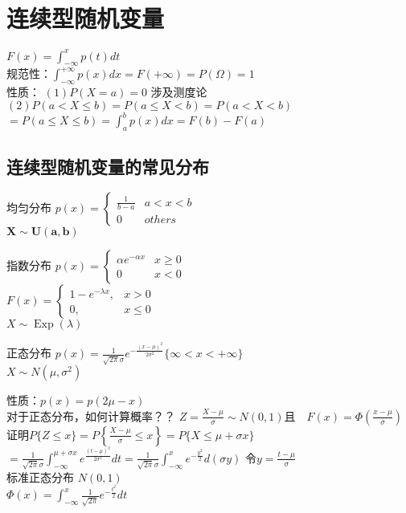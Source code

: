 \documentclass[cn,11pt,chinese,black]{elegantbook}
\begin{document}
\section{连续型随机变量 }
$F(x)=\int_{-\infty}^{x} p(t) d t$\\
规范性：$\int_{-\infty}^{+\infty} p(x) d x=F(+\infty)=P(\Omega)=1$\\
性质：
$(1)P(X=a)=0$ 涉及测度论\\
$(2)P(a<X \leq b)=P(a \leq X<b)=P(a<X<b)$\\
$=P(a \leq X \leq b)=\int_{a}^{b} p(x) d x=F(b)-F(a)$
\subsection{连续型随机变量的常见分布}
\begin{definition}{均匀分布}
$p(x)=\left\{\begin{array}{ll}{\frac{1}{b-a}} & {a<x<b} \\ {0} & {others}\end{array}\right.$\\
$\boldsymbol{X} \sim \boldsymbol{U}(\boldsymbol{a}, \boldsymbol{b})$
\end{definition}
\begin{definition}{指数分布}
$p(x)=\left\{\begin{array}{ll}{\alpha e^{-\alpha x}} & {x \geq 0} \\ {0} & {x<0}\end{array}\right.$\\
$F(x)=\left\{\begin{array}{cc}{1-e^{-\lambda x},} & {x>0} \\ {0,} & {x \leq 0}\end{array}\right.$\\
$X \sim \operatorname{Exp}(\lambda)$
\end{definition}
\begin{definition}{正态分布}
$p(x)=\frac{1}{\sqrt{2 \pi} \sigma} e^{-\frac{(x-\mu)^{2}}{2 \sigma^{2}}}\lbrace \infty<x<+\infty \rbrace$ \\
$X \sim N\left(\mu, \sigma^{2}\right)$
 \end{definition}

性质：$p(x)=p(2 \mu-x)$\\
对于正态分布，如何计算概率？？
$Z=\frac{X-\mu}{\sigma} \sim N(0,1)且\quad F(x)=\Phi\left(\frac{x-\mu}{\sigma}\right)$\\
证明$P\{Z \leq x\}=P\left\{\frac{X-\mu}{\sigma} \leq x\right\}=P\{X \leq \mu+\sigma x\}$\\
$=\frac{1}{\sqrt{2 \pi} \sigma} \int_{-\infty}^{\mu+\sigma x} e^{\frac{(t-\mu)^{2}}{2 \sigma^{2}}} d t= \frac{1}{\sqrt{2 \pi} \sigma} \int_{-\infty}^{x} e^{-\frac{y^{2}}{2}} d(\sigma y)$ 令$y=\frac{t-\mu}{\sigma}$\\
标准正态分布 $N(0,1)$\\
$\Phi(x)=\int_{-\infty}^{x} \frac{1}{\sqrt{2 \pi}} e^{-\frac{t^{2}}{2}} d t$
\end{document}
